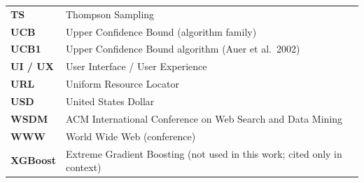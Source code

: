 \begin{xltabular}{\linewidth}{@{}p{3.5cm} X@{}}
\textbf{TS}         & Thompson Sampling\\
\textbf{UCB}        & Upper Confidence Bound (algorithm family)\\
\textbf{UCB1}       & Upper Confidence Bound algorithm (Auer et al.\ 2002)\\
\textbf{UI / UX}    & User Interface / User Experience\\
\textbf{URL}        & Uniform Resource Locator\\
\textbf{USD}        & United States Dollar\\
\textbf{WSDM}       & ACM International Conference on Web Search and Data Mining\\
\textbf{WWW}        & World Wide Web (conference)\\
\textbf{XGBoost}    & Extreme Gradient Boosting (not used in this work; cited only in context)\\
\end{xltabular}

